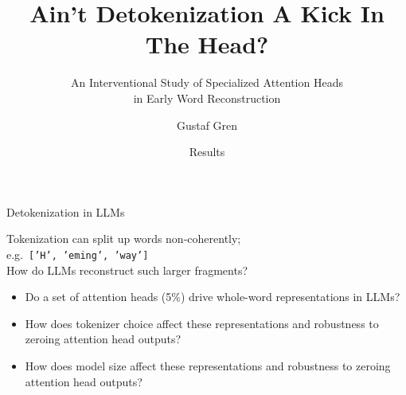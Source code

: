\documentclass{beamer}
\title{Ain't Detokenization A Kick In The Head?}
\subtitle{An Interventional Study of Specialized Attention Heads \\ in Early Word Reconstruction}
\author{Gustaf Gren}
\date{Results}
\begin{document}
\begin{frame}
  \titlepage
\end{frame}

\begin{frame}{Detokenization in LLMs}

Tokenization can split up words non-coherently;\\
e.g.\ \texttt{['H',~'eming',~'way']} \\
How do LLMs reconstruct such larger fragments?

\vfill

\begin{itemize}
\item[\textbf{RQ1}] Do a set of attention heads (5\%) drive whole-word representations in LLMs?
\item[\textbf{RQ2}] How does tokenizer choice affect these representations and robustness to zeroing attention head outputs?
\item[\textbf{RQ3}] How does model size affect these representations and robustness to zeroing attention head outputs?
\end{itemize}

\end{frame}
\end{document}
